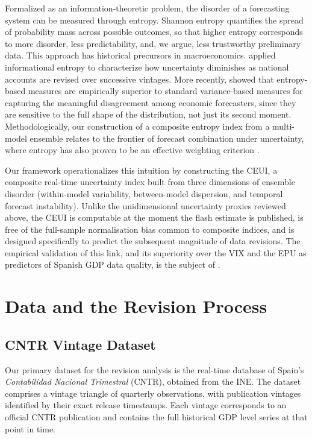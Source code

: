\documentclass[12pt,a4paper]{article}
\theoremstyle{remark}
\begin{document}
Formalized as an information-theoretic problem, the disorder of a forecasting system can be measured through entropy. Shannon entropy quantifies the spread of probability mass across possible outcomes, so that higher entropy corresponds to more disorder, less predictability, and, we argue, less trustworthy preliminary data. This approach has historical precursors in macroeconomics. \citet{patterson1991} applied informational entropy to characterize how uncertainty diminishes as national accounts are revised over successive vintages. More recently, \citet{shoja2017} showed that entropy-based measures are empirically superior to standard variance-based measures for capturing the meaningful disagreement among economic forecasters, since they are sensitive to the full shape of the distribution, not just its second moment. Methodologically, our construction of a composite entropy index from a multi-model ensemble relates to the frontier of forecast combination under uncertainty, where entropy has also proven to be an effective weighting criterion \citep{breto2019}.

Our framework operationalizes this intuition by constructing the CEUI, a composite real-time uncertainty index built from three dimensions of ensemble disorder (within-model variability, between-model dispersion, and temporal forecast instability). Unlike the unidimensional uncertainty proxies reviewed above, the CEUI is computable at the moment the flash estimate is published, is free of the full-sample normalisation bias common to composite indices, and is designed specifically to predict the subsequent magnitude of data revisions. The empirical validation of this link, and its superiority over the VIX and the EPU as predictors of Spanish GDP data quality, is the subject of .


\section{Data and the Revision Process}
\label{sec:data_revision}

\subsection{CNTR Vintage Dataset}
Our primary dataset for the revision analysis is the real-time database of Spain's \textit{Contabilidad Nacional Trimestral} (CNTR), obtained from the INE. The dataset comprises a vintage triangle of quarterly observations, with publication vintages identified by their exact release timestamps. Each vintage corresponds to an official CNTR publication and contains the full historical GDP level series at that point in time.
\end{document}
